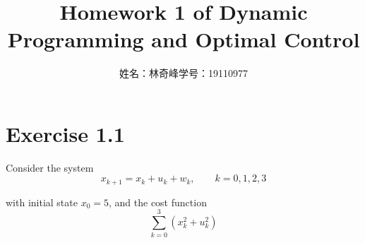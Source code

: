 \documentclass{article}
\begin{document}
    \title{Homework 1 of Dynamic Programming and Optimal Control}
    \author{姓名：林奇峰\qquad 学号：19110977}
    \maketitle

    \section{Exercise 1.1}
    Consider the system
    \begin{equation*}
        x_{k+1}=x_k+u_k+w_k,\qquad k=0,1,2,3
    \end{equation*}
    
    with initial state $x_0=5$, and the cost function
    \begin{equation*}
        \sum_{k=0}^3(x_k^2+u_k^2)
    \end{equation*}
    
\end{document}
